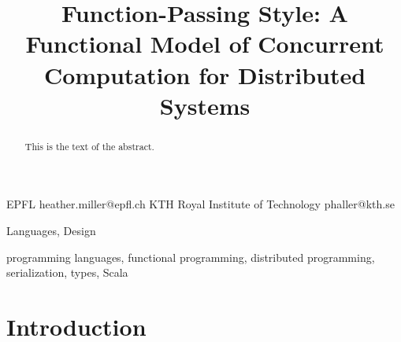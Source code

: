 \documentclass{sigplanconf}
\theoremstyle{definition}
\theoremstyle{definition}
\begin{document}
\setlength{\pdfpageheight}{\paperheight}
\setlength{\pdfpagewidth}{\paperwidth}

\setmainfont[Mapping=tex-text]{Times New Roman}
\setmonofont[Scale=0.8,BoldFont={Consolas Bold}]{Consolas}






\title{Function-Passing Style: A Functional Model of Concurrent Computation for Distributed Systems}

           {EPFL}
           {heather.miller@epfl.ch}
           {KTH Royal Institute of Technology}
           {phaller@kth.se}

\maketitle

\begin{abstract}
This is the text of the abstract.
\end{abstract}


\terms
Languages, Design

\keywords
programming languages, functional programming, distributed programming, serialization, types, Scala

\section{Introduction}
\end{document}
